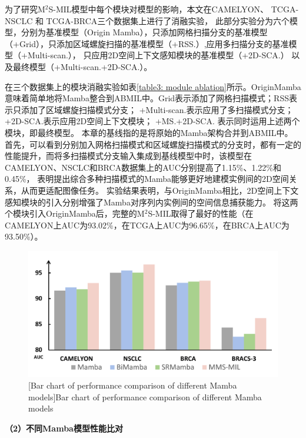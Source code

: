 为了研究M$^2$S-MIL模型中每个模块对模型的影响，本文在CAMELYON、 TCGA-NSCLC 和 TCGA-BRCA三个数据集上进行了消融实验，
此部分实验分为六个模型，分别为基准模型（Origin Mamba），只添加网格扫描分支的基准模型（+Grid），只添加区域螺旋扫描的基准模型（+RSS.）,应用多扫描分支的基准模型（+Multi-scan.），
只应用2D空间上下文感知模块的基准模型（+2D-SCA.） 以及最终模型（+Multi-scan.+2D-SCA.）。

在三个数据集上的模块消融实验如表\ref{table3: module ablation}所示。OriginMamba意味着简单地将Mamba整合到ABMIL中。Grid表示添加了网格扫描模式；RSS表示只添加了区域螺旋扫描模式分支；
+Multi-scan.表示应用了多扫描模式分支；+2D-SCA.表示应用2D空间上下文模块； +MS.+2D-SCA. 表示同时运用上述两个模块，即最终模型。
本章的基线指的是将原始的Mamba架构合并到ABMIL中。
首先，可以看到分别加入网格扫描模式和区域螺旋扫描模式的分支时，都有一定的性能提升，而将多扫描模式分支输入集成到基线模型中时，该模型在CAMELYON、NSCLC和BRCA数据集上的AUC分别提高了1.15\%、1.22\%和0.45\%，
表明提出综合多种扫描模式的Mamba能够更好地建模实例间的2D空间关系，从而更适配图像任务。
实验结果表明，与OriginMamba相比，2D空间上下文感知模块的引入分别增强了Mamba对序列内实例间的空间信息捕获能力。
将这两个模块引入OriginMamba后，完整的M$^2$S-MIL取得了最好的性能（在CAMELYON上AUC为93.02\%，在TCGA上AUC为96.65\%，在BRCA上AUC为93.50\%）。

\begin{figure}[ht]
  \centering
  \includegraphics[width=0.9\columnwidth]{figures/MMSMIL的不同Mamba比较.pdf}
  [Bar chart of performance comparison of different Mamba models]{Bar chart of performance comparison of different Mamba models}
  \label{figure3: DifferentMamba}
\end{figure}
\textbf{（2）不同Mamba模型性能比对}



